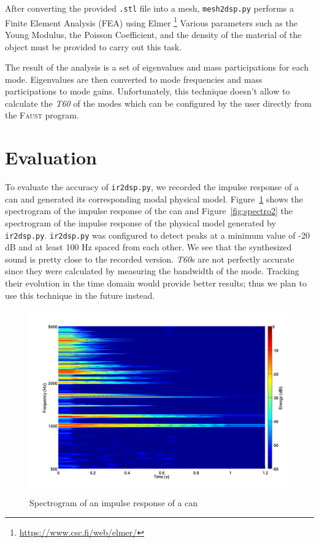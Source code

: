 \documentclass[11pt,a4paper]{article}
\newcommand{\f}{\textsc{Faust}}
\begin{document}
After converting the provided \texttt{.stl} file into a mesh, \texttt{mesh2dsp.py} performs a Finite Element Analysis (FEA) using Elmer \footnote{\url{https://www.csc.fi/web/elmer/}} Various parameters such as the Young Modulus, the Poisson Coefficient, and the density of the material of the object must be provided to carry out this task.

The result of the analysis is a set of eigenvalues and mass participations for each mode. Eigenvalues are then converted to mode frequencies and mass participations to mode gains. Unfortunately, this technique doesn't allow to calculate the \textit{T60} of the modes which can be configured by the user directly from the \f{} program.

\section{Evaluation}

To evaluate the accuracy of \texttt{ir2dsp.py}, we recorded the impulse response of a can and generated its corresponding modal physical model. Figure~\ref{fig:spectro1} shows the spectrogram of the impulse response of the can and Figure~\ref{fig:spectro2} the spectrogram of the impulse response of the physical model generated by \texttt{ir2dsp.py}. \texttt{ir2dsp.py} was configured to detect peaks at a minimum value of -20 dB and at least 100 Hz spaced from each other. We see that the synthesized sound is pretty close to the recorded version. \textit{T60}s are not perfectly accurate since they were calculated by measuring the bandwidth of the mode. Tracking their evolution in the time domain would provide better results; thus we plan to use this technique in the future instead.

\begin{figure}[htbp]
  \centering
  \includegraphics[width=\columnwidth]{pictures/canIR}
  \caption{Spectrogram of an impulse response of a can}
  \label{fig:spectro1}
\end{figure}
\end{document}
